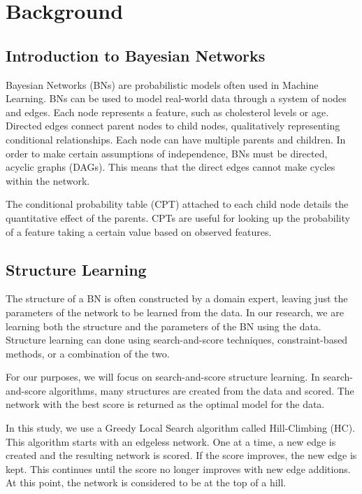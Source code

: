 
\section{Background}
\subsection{Introduction to Bayesian Networks}

Bayesian Networks (BNs) are probabilistic models often used in Machine Learning. BNs can be used to model real-world data through a system of nodes and edges. Each node represents a feature, such as cholesterol levels or age. Directed edges connect parent nodes to child nodes, qualitatively representing conditional relationships. Each node can have multiple parents and children. In order to make certain assumptions of independence, BNs must be directed, acyclic graphs (DAGs). This means that the direct edges cannot make cycles within the network.\cite{Russell1995} 

The conditional probability table (CPT) attached to each child node details the quantitative effect of the parents. CPTs are useful for looking up the probability of a feature taking a certain value based on observed features. 

\subsection{Structure Learning}
The structure of a BN is often constructed by a domain expert, leaving just the parameters of the network to be learned from the data. In our research, we are learning both the structure and the parameters of the BN using the data. Structure learning can done using search-and-score techniques, constraint-based methods, or a combination of the two. \cite{Vol2012}  

For our purposes, we will focus on search-and-score structure learning. In search-and-score algorithms, many structures are created from the data and scored. The network with the best score is returned as the optimal model for the data.

In this study, we use a Greedy Local Search algorithm called Hill-Climbing (HC). This algorithm starts with an edgeless network. One at a time, a new edge is created and the resulting network is scored. If the score improves, the new edge is kept. This continues until the score no longer improves with new edge additions. At this point, the network is considered to be at the top of a hill.

